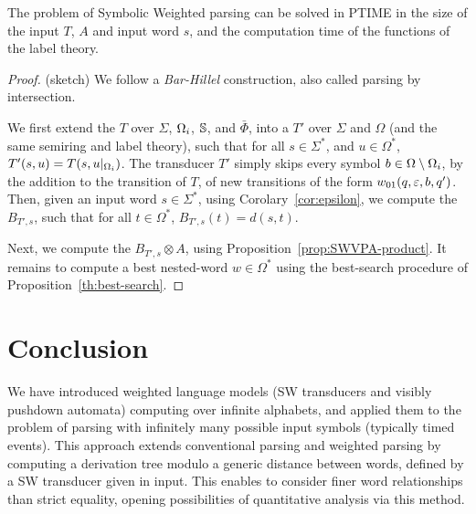 %
\begin{proposition}
The problem of Symbolic Weighted  parsing 
can be solved in PTIME in the size of the input \SWT $T$, \SWVPA $A$
and input word $s$, 
and the computation time of the functions of the label theory.
\end{proposition}
\begin{proof} (sketch)
We follow a \emph{Bar-Hillel} construction, also called parsing by intersection.

\noindent
We first extend the \SWT $T$ over $\Sigma$, $\Omegai$, $\mathbb{S}$, and $\bar\Phi$, 
into a \SWT $T'$ over $\Sigma$ and $\Omega$ (and the same semiring and label theory),
such that for all $s \in \Sigma^*$, and $u \in {\Omega}^*$, 
$T'(s, u) = T(s, u|_{\Omegai})$. The transducer $T'$ simply skips every symbol 
$b \in {\Omega} \setminus \Omegai$, 
by the addition to the transition of $T$,
of new transitions of the form $\wei_{01}(q, \varepsilon, b, q')$.
%
\noindent
Then, given an input word $s \in \Sigma^*$, 
using Corolary~\ref{cor:epsilon}, 
we compute the \SWA $B_{T', s}$, 
such that for all $t \in \Omega^*$, $B_{T', s}(t) = d(s, t)$.
%

\noindent
Next, %
we compute the \SWVPA $B_{T', s} \otimes A$, 
using Proposition~\ref{prop:SWVPA-product}.
%
\noindent
It remains to compute a best nested-word $w \in {\Omega}^*$ 
using the best-search procedure of Proposition~\ref{th:best-search}.
\end{proof}

%



\section*{Conclusion}
We have introduced weighted language models (SW transducers and visibly pushdown automata)
computing over infinite alphabets, 
and applied them to the problem of parsing 
with infinitely many possible input symbols (typically timed events).
%
This approach extends conventional parsing and weighted parsing
by computing a derivation tree modulo 
a generic distance between words,  
defined by a SW transducer given in input.
This enables to consider finer word relationships than strict equality, 
opening possibilities of quantitative analysis via this method.

